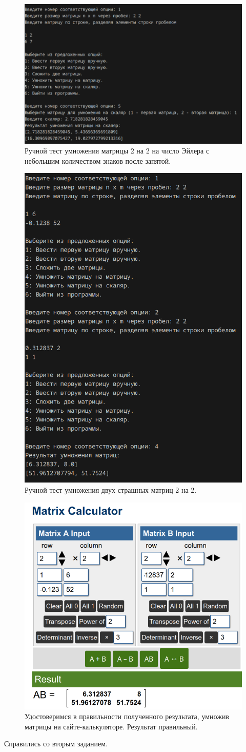 \begin{figure}[H]
	\centering
	\includegraphics[width=0.58\linewidth]{tests-task6}
	\caption*{Ручной тест умножения матрицы 2 на 2 на число Эйлера с небольшим количеством знаков после запятой.}
	\label{fig:tests-task6}
\end{figure}
\begin{figure}[H]
	\centering
	\includegraphics[width=0.7\linewidth]{tests-task7}
	\caption*{Ручной тест умножения двух страшных матриц 2 на 2.}
	\label{fig:tests-task7}
\end{figure}
\begin{figure}[H]
	\centering
	\includegraphics[width=0.5\linewidth]{tests-task8}
	\caption*{Удостоверимся в правильности полученного результата, умножив матрицы на сайте-калькуляторе. Результат правильный.}
	\label{fig:tests-task8}
\end{figure}
Справились со вторым заданием.



